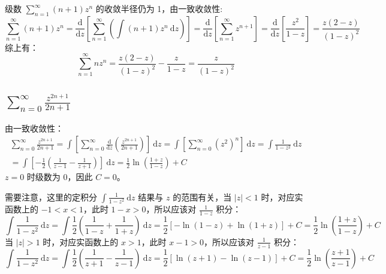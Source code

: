 \documentclass[UTF8]{report}
\theoremstyle{MyLineTheoremStyle} %
\theoremstyle{MyBlockTheoremStyle} %
\theoremstyle{MySubsubsectionStyle} %
\begin{document}
级数 $\sum_{n=1}^{\infty} (n+1) z^n$ 的收敛半径仍为 1，由一致收敛性: 
\begin{equation}
    \sum_{n=1}^{\infty} (n+1) z^n
    = \frac{\mathrm{d} }{\mathrm{d} z } \left[ \sum_{n=1}^{\infty} \left( \int (n+1) z^n \ \mathrm{d}z\right) \right]
    = \frac{\mathrm{d} }{\mathrm{d} z } \left[ \sum_{n=1}^{\infty}  z^{n+1}  \right]
    = \frac{\mathrm{d} }{\mathrm{d} z } \left[ \frac{z^2}{1 - z} \right]
    = \frac{z(2 - z)}{(1 - z)^2}
\end{equation}
综上有：
\begin{equation}
    \sum_{n=1}^{\infty} n z^n 
    = \frac{z(2 - z)}{(1 - z)^2} - \frac{z}{1 - z} 
    = \frac{z}{(1 - z)^2}
\end{equation}

\subsection{$\displaystyle \sum_{n=0}^{\infty} \frac{z^{2n+1}}{2n+1}$}
由一致收敛性：
\begin{gather}
    \sum_{n=0}^{\infty} \frac{z^{2n+1}}{2n+1}
    =  \int \left[ \sum_{n=0}^{\infty}  \frac{\mathrm{d} }{\mathrm{d} z }  \left(\frac{z^{2n+1}}{2n+1}\right) \right]\ \mathrm{d}z
    =  \int \left[  \sum_{n=0}^{\infty} \left(z^2\right)^{n}  \right]\ \mathrm{d}z 
    =  \int \frac{1}{1 - z^2} \ \mathrm{d}z \\ 
    =  \int \left[ - \frac{1}{2} \left(\frac{1}{z - 1} - \frac{1}{z + 1}\right) \right] \ \mathrm{d}z
    =  \frac{1}{2}\ln \left(\frac{1 + z}{1 - z}\right) + C
\end{gather}
$z = 0$ 时级数为 0，因此 $C = 0$。
{\par\color{gray}\small
需要注意，这里的定积分 $\int \frac{1}{1 - z^2} \ \mathrm{d}z$ 结果与 $z$ 的范围有关，当 $| z | < 1$ 时，对应实函数上的 $ -1 < x < 1$，此时 $1 - x > 0$，所以应该对 $\frac{1}{1 - z}$ 积分：
\begin{equation}
    \int \frac{1}{1 - z^2} \ \mathrm{d}z = \int \frac{1}{2}\left( \frac{1}{1 - z} + \frac{1}{1 + z} \right) \ \mathrm{d}z = \frac{1}{2}\left[- \ln (1 - z) + \ln (1 + z)\right] + C = \frac{1}{2}\ln \left(\frac{1 + z}{1 - z}\right) + C
\end{equation}
当 $| z | > 1$ 时，对应实函数上的 $x > 1$，此时 $x - 1 > 0$，所以应该对 $\frac{1}{z - 1}$ 积分：
\begin{equation}
    \int \frac{1}{1 - z^2} \ \mathrm{d}z = \int \frac{1}{2}\left(  \frac{1}{z + 1} - \frac{1}{z - 1} \right) \ \mathrm{d}z = \frac{1}{2}\left[\ln (z + 1) - \ln (z - 1)\right] + C = \frac{1}{2}\ln \left(\frac{z + 1}{z - 1}\right) + C
\end{equation}
\par}
\end{document}
